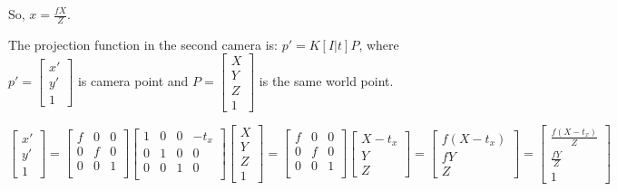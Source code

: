 \documentclass{article}
\begin{document}
So, $x = \frac{fX}{Z}$.

The projection function in the second camera is: $p' = K[I|t] P$, 
where $p' = \begin{bmatrix}
  x' \\ y' \\ 1
\end{bmatrix}$ is camera point and $P = \begin{bmatrix}
  X \\ Y \\ Z \\ 1
\end{bmatrix}$ is the same world point.

$$
  \begin{bmatrix}
    x' \\ y' \\ 1
  \end{bmatrix} = \begin{bmatrix}
    f & 0 & 0 \\ 0 & f & 0 \\ 0 & 0 & 1 \\
  \end{bmatrix}\begin{bmatrix}
    1 & 0 & 0 & -t_x \\
    0 & 1 & 0 & 0 \\
    0 & 0 & 1 & 0 \\
  \end{bmatrix}\begin{bmatrix}
    X \\ Y \\ Z \\ 1
  \end{bmatrix} = \begin{bmatrix}
    f & 0 & 0 \\
    0 & f & 0 \\
    0 & 0 & 1 \\
  \end{bmatrix}\begin{bmatrix}
    X - t_x \\ Y \\ Z
  \end{bmatrix} = \begin{bmatrix}
    f(X-t_x) \\ fY \\ Z
  \end{bmatrix} = \begin{bmatrix}
    \frac{f(X-t_x)}{Z} \\ \frac{fY}{Z} \\ 1
  \end{bmatrix} 
$$
\end{document}
